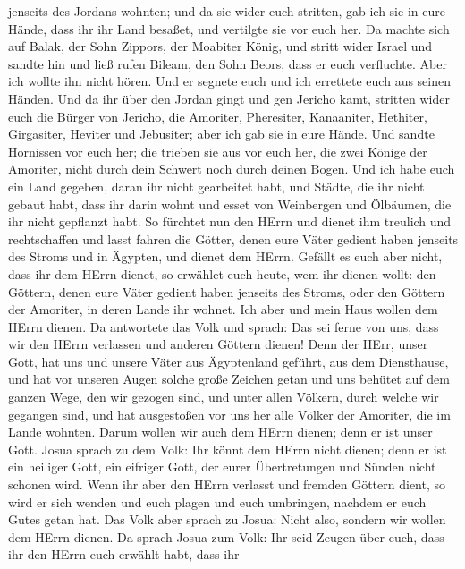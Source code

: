 jenseits des Jordans wohnten; und da sie wider euch stritten, gab ich
sie in eure Hände, dass ihr ihr Land besaßet, und vertilgte sie vor euch
her.  Da machte sich auf Balak, der Sohn Zippors, der
Moabiter König, und stritt wider Israel und sandte hin und ließ rufen
Bileam, den Sohn Beors, dass er euch verfluchte.  Aber ich
wollte ihn nicht hören. Und er segnete euch und ich errettete euch aus
seinen Händen.  Und da ihr über den Jordan gingt und gen
Jericho kamt, stritten wider euch die Bürger von Jericho, die Amoriter,
Pheresiter, Kanaaniter, Hethiter, Girgasiter, Heviter und Jebusiter;
aber ich gab sie in eure Hände.  Und sandte Hornissen vor
euch her; die trieben sie aus vor euch her, die zwei Könige der
Amoriter, nicht durch dein Schwert noch durch deinen Bogen.
 Und ich habe euch ein Land gegeben, daran ihr nicht
gearbeitet habt, und Städte, die ihr nicht gebaut habt, dass ihr darin
wohnt und esset von Weinbergen und Ölbäumen, die ihr nicht gepflanzt
habt.  So fürchtet nun den HErrn und dienet ihm treulich
und rechtschaffen und lasst fahren die Götter, denen eure Väter gedient
haben jenseits des Stroms und in Ägypten, und dienet dem HErrn.
 Gefällt es euch aber nicht, dass ihr dem HErrn dienet, so
erwählet euch heute, wem ihr dienen wollt: den Göttern, denen eure Väter
gedient haben jenseits des Stroms, oder den Göttern der Amoriter, in
deren Lande ihr wohnet. Ich aber und mein Haus wollen dem HErrn dienen.
 Da antwortete das Volk und sprach: Das sei ferne von uns,
dass wir den HErrn verlassen und anderen Göttern dienen! 
Denn der HErr, unser Gott, hat uns und unsere Väter aus Ägyptenland
geführt, aus dem Diensthause, und hat vor unseren Augen solche große
Zeichen getan und uns behütet auf dem ganzen Wege, den wir gezogen sind,
und unter allen Völkern, durch welche wir gegangen sind, 
und hat ausgestoßen vor uns her alle Völker der Amoriter, die im Lande
wohnten. Darum wollen wir auch dem HErrn dienen; denn er ist unser Gott.
 Josua sprach zu dem Volk: Ihr könnt dem HErrn nicht
dienen; denn er ist ein heiliger Gott, ein eifriger Gott, der eurer
Übertretungen und Sünden nicht schonen wird.  Wenn ihr aber
den HErrn verlasst und fremden Göttern dient, so wird er sich wenden und
euch plagen und euch umbringen, nachdem er euch Gutes getan hat.
 Das Volk aber sprach zu Josua: Nicht also, sondern wir
wollen dem HErrn dienen.  Da sprach Josua zum Volk: Ihr
seid Zeugen über euch, dass ihr den HErrn euch erwählt habt, dass ihr
